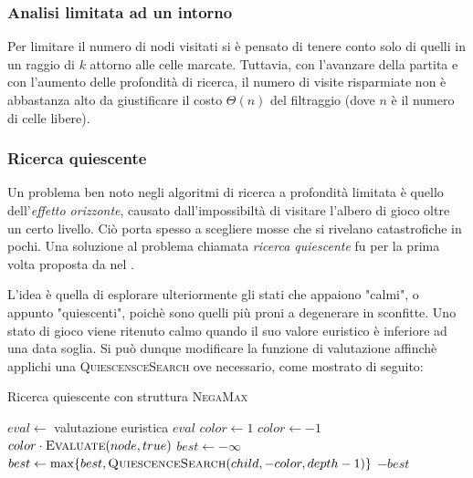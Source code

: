 \documentclass{article}
\begin{document}

\subsubsection{Analisi limitata ad un intorno}

Per limitare il numero di nodi visitati si \`e pensato di tenere conto solo di
quelli in un raggio di $k$ attorno alle celle marcate. Tuttavia, con l'avanzare
della partita e con l'aumento delle profondit\`a di ricerca, il numero di visite
risparmiate non \`e abbastanza alto da giustificare il costo $\Theta(n)$ del
filtraggio (dove $n$ \`e il numero di celle libere).

\subsubsection{Ricerca quiescente}

Un problema ben noto negli algoritmi di ricerca a profondit\`a limitata \`e
quello dell'\emph{effetto orizzonte}, causato dall'impossibilt\`a 
di visitare l'albero di gioco oltre un certo livello. Ci\`o porta spesso a scegliere 
mosse che si rivelano catastrofiche in pochi. Una soluzione al problema chiamata
\emph{ricerca quiescente} \cite{quiescence} fu per la prima volta proposta da
\citeauthor{quiescence} nel \citeyear{quiescence}.

L'idea \`e quella di esplorare ulteriormente gli stati che appaiono "calmi", o
appunto "quiescenti", poich\`e sono quelli pi\`u proni a degenerare in sconfitte.
Uno stato di gioco viene ritenuto calmo quando il suo valore euristico \`e inferiore
ad una data soglia. Si pu\`o dunque modificare la funzione di valutazione affinch\`e
applichi una \textsc{QuiescensceSearch} ove necessario, come mostrato di seguito:

\begin{algorithm}[H]
  \caption{Ricerca quiescente con struttura \textsc{NegaMax}}
  \label{qs}
  \begin{algorithmic}[0]
      \State $eval \gets $ valutazione euristica
        \State \Return $eval$
      \Else
        \State $color \gets 1$
          \State $color \gets -1$
        \EndIf
        \State \Return {}
      \EndIf
    \EndProcedure
    \Statex
      \State \Return $color \cdot \Call{Evaluate}{node, true}$
    \EndIf
    \State $best \gets -\infty$
      \State $best \gets \max\{best, \Call{QuiescenceSearch}{child, -color, depth-1}\}$
    \EndFor
    \State \Return $-best$
    \EndProcedure
  \end{algorithmic}
\end{algorithm}
\end{document}
